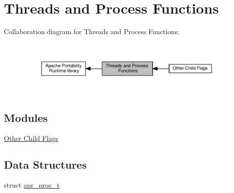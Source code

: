 \hypertarget{group__apr__thread__proc}{}\section{Threads and Process Functions}
\label{group__apr__thread__proc}
Collaboration diagram for Threads and Process Functions\+:
\nopagebreak
\begin{figure}[H]
\begin{center}
\leavevmode
\includegraphics[width=350pt]{group__apr__thread__proc}
\end{center}
\end{figure}
\subsection*{Modules}
\begin{DoxyCompactItemize}
\item 
\hyperlink{group__APR__OC}{Other Child Flags}
\end{DoxyCompactItemize}
\subsection*{Data Structures}
\begin{DoxyCompactItemize}
\item 
struct \hyperlink{structapr__proc__t}{apr\+\_\+proc\+\_\+t}
\end{DoxyCompactItemize}
